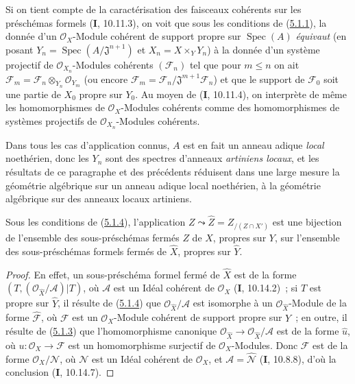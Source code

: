 \begin{scholium}[5.1.7]
\label{III.5.1.7-fr}
Si on tient compte de la caractérisation des faisceaux cohérents sur les préschémas
formels (\textbf{I}, 10.11.3), on voit que sous les conditions de
(\hyperref[III.5.1.1-fr]{5.1.1}), la donnée d'un $\mathcal O_X$-Module cohérent de
support propre sur $\operatorname{Spec}(A)$ \emph{équivaut} (en posant
$Y_n=\operatorname{Spec}(A/\mathfrak J^{n+1})$ et $X_n=X\times_Y Y_n$) à la donnée
d'un système projectif de $\mathcal O_{X_n}$-Modules cohérents $(\mathcal F_n)$ tel
que pour $m\leq n$ on ait
$\mathcal F_m=\mathcal F_n\otimes_{Y_n}\mathcal O_{Y_m}$
(ou encore $\mathcal F_m=\mathcal F_n/\mathfrak J^{m+1}\mathcal F_n$)
et que le support de $\mathcal F_0$ soit une partie de $X_0$ propre sur $Y_0$. Au
moyen de (\textbf{I}, 10.11.4), on interprète de même les homomorphismes de
$\mathcal O_X$-Modules cohérents comme des homomorphismes de systèmes projectifs de
$\mathcal O_{X_n}$-Modules cohérents.


Dans tous les cas d'application connus, $A$ est en fait un anneau adique \emph{local}
noethérien, donc les $Y_n$ sont des spectres d'anneaux \emph{artiniens locaux}, et les
résultats de ce paragraphe et des précédents réduisent dans une large mesure la
géométrie algébrique sur un anneau adique local noethérien, à la géométrie algébrique
sur des anneaux locaux artiniens.
\end{scholium}

\begin{corollary}[5.1.8]
\label{III.5.1.8-fr}
Sous les conditions de \textup{(\hyperref[III.5.1.4-fr]{5.1.4})}, l'application
$Z\leadsto\widehat Z=Z_{/(Z\cap X')}$ est une bijection de l'ensemble des
sous-préschémas fermés $Z$ de $X$, propres sur $Y$, sur l'ensemble des
sous-préschémas formels fermés de $\widehat X$, propres sur $\widehat Y$.
\end{corollary}

\begin{proof}
En effet, un sous-préschéma formel fermé de $\widehat X$ est de la forme
$(T,(\mathcal O_{\widehat X}/\mathcal A)|T)$, où $\mathcal A$ est un Idéal
cohérent de $\mathcal O_X$ (\textbf{I}, 10.14.2)~; si $T$ est propre sur
$\widehat Y$, il résulte de (\hyperref[III.5.1.4-fr]{5.1.4}) que
$\mathcal O_{\widehat X}/\mathcal A$ est isomorphe à un
$\mathcal O_{\widehat X}$-Module de la forme $\widehat{\mathcal F}$, où
$\mathcal F$ est un $\mathcal O_X$-Module cohérent de support propre sur $Y$~; en
outre, il résulte de (\hyperref[III.5.1.3-fr]{5.1.3}) que l'homomorphisme canonique
$\mathcal O_{\widehat X}\to\mathcal O_{\widehat X}/\mathcal A$ est de la forme
$\widehat u$, où $u:\mathcal O_X\to\mathcal F$ est un homomorphisme surjectif de
$\mathcal O_X$-Modules. Donc $\mathcal F$ est de la forme
$\mathcal O_X/\mathcal N$, où $\mathcal N$ est un Idéal cohérent de
$\mathcal O_X$, et $\mathcal A=\widehat{\mathcal N}$ (\textbf{I}, 10.8.8), d'où la
conclusion (\textbf{I}, 10.14.7).
\end{proof}

